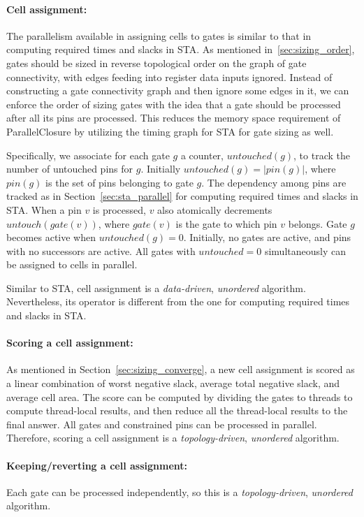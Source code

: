 \paragraph{Cell assignment:} The parallelism available in assigning cells to gates is similar to that in computing required times and slacks in STA. As mentioned in~\ref{sec:sizing_order}, gates should be sized in reverse topological order on the graph of gate connectivity, with edges feeding into register data inputs ignored. Instead of constructing a gate connectivity graph and then ignore some edges in it, we can enforce the order of sizing gates with the idea that a gate should be processed after all its pins are processed. This reduces the memory space requirement of ParallelClosure by utilizing the timing graph for STA for gate sizing as well.

Specifically, we associate for each gate $g$ a counter, $untouched(g)$, to track the number of untouched pins for $g$. Initially $untouched(g) = |pin(g)|$, where $pin(g)$ is the set of pins belonging to gate $g$. The dependency among pins are tracked as in Section~\ref{sec:sta_parallel} for computing required times and slacks in STA. When a pin $v$ is processed, $v$ also atomically decrements $untouch(gate(v))$, where $gate(v)$ is the gate to which pin $v$ belongs. Gate $g$ becomes active when $untouched(g) = 0$. Initially, no gates are active, and pins with no successors are active. All gates with $untouched = 0$ simultaneously can be assigned to cells in parallel.

Similar to STA, cell assignment is a {\em data-driven}, {\em unordered} algorithm. Nevertheless, its operator is different from the one for computing required times and slacks in STA.

\paragraph{Scoring a cell assignment:} As mentioned in Section~\ref{sec:sizing_converge}, a new cell assignment is scored as a linear combination of worst negative slack, average total negative slack, and average cell area. The score can be computed by dividing the gates to threads to compute thread-local results, and then reduce all the thread-local results to the final answer. All gates and constrained pins can be processed in parallel. Therefore, scoring a cell assignment is a {\em topology-driven}, {\em unordered} algorithm.

\paragraph{Keeping/reverting a cell assignment:} Each gate can be processed independently, so this is a {\em topology-driven}, {\em unordered} algorithm.

